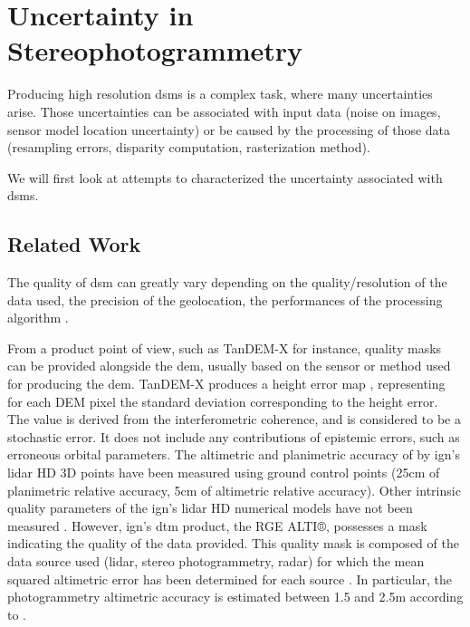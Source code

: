 \section{Uncertainty in Stereophotogrammetry}\label{sec:previous_work_stereo_uncertainty}
Producing high resolution \acrshort{dsm}s is a complex task, where many uncertainties arise. Those uncertainties can be associated with input data (noise on images, sensor model location uncertainty) or be caused by the processing of those data (resampling errors, disparity computation, rasterization method).

We will first look at attempts to characterized the uncertainty associated with \acrshort{dsm}s.

\subsection{Related Work}\label{sec:related_work}
The quality of \acrshort{dsm} can greatly vary depending on the quality/resolution of the data used, the precision of the geolocation, the performances of the processing algorithm \etc.

From a product point of view, such as TanDEM-X for instance, quality masks can be provided alongside the \acrshort{dem}, usually based on the sensor or method used for producing the \acrshort{dem}. TanDEM-X produces a height error map \cite{wessel_tandem-x_2018}, representing for each DEM pixel the standard deviation corresponding to the height error. The value is derived from the interferometric coherence, and is considered to be a stochastic error. It does not include any contributions of epistemic errors, such as erroneous orbital parameters. The altimetric and planimetric accuracy of by \acrshort{ign}'s \acrshort{lidar} HD 3D points have been measured using ground control points (25cm of planimetric relative accuracy, 5cm of altimetric relative accuracy). Other intrinsic quality parameters of the \acrshort{ign}'s \acrshort{lidar} HD numerical models have not been measured \cite{ign_lidar_2024}. However, \acrshort{ign}'s \acrshort{dtm} product, the RGE ALTI®, possesses a mask indicating the quality of the data provided. This quality mask is composed of the data source used (\acrshort{lidar}, stereo photogrammetry, \acrshort{radar}) for which the mean squared altimetric error has been determined for each source \cite{ign_rge_alti_2013}. In particular, the photogrammetry altimetric accuracy is estimated between 1.5 and 2.5m according to \cite{ign_bd-topo_2013}.

